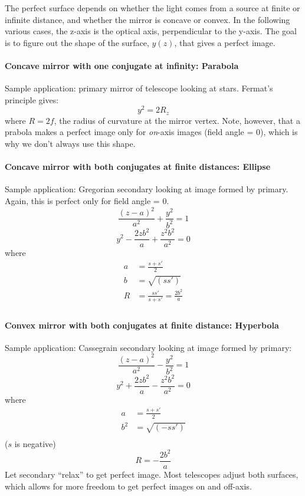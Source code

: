 \documentclass[12pt]{article}
\begin{document}
The perfect surface depends on whether the light comes from a source at finite
or infinite distance, and whether the mirror is concave or convex. In the
following various cases, the z-axis is the optical axis, perpendicular to the
y-axis. The goal is to figure out the shape of the surface, $y(z)$, that gives
a perfect image.

\paragraph{Concave mirror with one conjugate at infinity: Parabola}
Sample application: primary mirror of telescope looking at stars.
Fermat's principle gives:
\[
    y^{2} = 2R_{z}
    \]
where $R = 2f$, the radius of curvature at the mirror vertex. Note, however,
that a prabola makes a perfect image only for \emph{on}-axis images (field
angle = 0), which is why we don't always use this shape.

\paragraph{Concave mirror with both conjugates at finite distances: Ellipse}
Sample application: Gregorian secondary looking at image formed by primary.
Again, this is perfect only for field angle = 0.
\[
    \frac{(z-a)^{2}}{a^{2}} + \frac{y^{2}}{b^{2}} = 1
    \]
\[
    y^{2} - \frac{2zb^{2}}{a} + \frac{z^{2}b^{2}}{a^{2}} = 0
    \]
where
\begin{align*}
    a &= \frac{s+s'}{2}\\
    b &= \sqrt{(ss')}\\
    R &= \frac{ss'}{s+s'} = \frac{2b^{2}}{a}\\
\end{align*}

\paragraph{Convex mirror with both conjugates at finite distance: Hyperbola}
Sample application: Cassegrain secondary looking at
image formed by primary:
\[
    \frac{(z-a)^{2}}{a^{2}} - \frac{y^{2}}{b^{2}} = 1
    \]
\[
    y^{2} + \frac{2zb^{2}}{a} - \frac{z^{2}b^{2}}{a^{2}} = 0
    \]
where
\begin{align*}
    a &= \frac{s+s'}{2}\\
    b^{2} &= \sqrt{(-ss')}\\
\end{align*}
($s$ is negative)
\[
    R = -\frac{2b^{2}}{a}
    \]
Let secondary ``relax'' to get perfect image. Most telescopes adjust
both surfaces, which allows for more freedom to get perfect images on
and off-axis.
\end{document}
